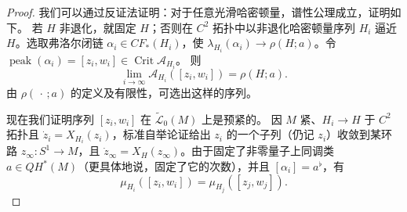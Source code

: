 \begin{proof}
我们可以通过反证法证明：对于任意光滑哈密顿量，谱性公理成立，证明如下。
若 $H$ 非退化，就固定 $H$；否则在 $C^2$ 拓扑中以非退化哈密顿量序列
$H_i$ 逼近 $H$。选取弗洛尔闭链 $\alpha_i\in CF_*(H_i)$，使
$\lambda_{H_i}(\alpha_i)\to\rho(H;a)$。令
$\operatorname{peak}(\alpha_i)=[z_i,w_i]\in\operatorname{Crit}\mathcal A_{H_i}$。
则
\begin{equation}
 \lim_{i\to\infty}\mathcal A_{H_i}([z_i,w_i])=\rho(H;a).
 \label{eq:21-peak-action-limit}
\end{equation}
由 $\rho(\,\cdot\,;a)$ 的定义及有限性，可选出这样的序列。

现在我们证明序列 $[z_i,w_i]$ 在 $\widetilde{\mathcal L}_0(M)$ 上是预紧的。
因 $M$ 紧、$H_i\to H$ 于 $C^2$ 拓扑且 $\dot z_i=X_{H_i}(z_i)$，标准自举论证给出
$z_i$ 的一个子列（仍记 $z_i$）收敛到某环路 $z_\infty:S^1\to M$，且
$\dot z_\infty=X_H(z_\infty)$。由于固定了非零量子上同调类
$a\in QH^*(M)$（更具体地说，固定了它的次数），并且 $[\alpha_i]=a^\flat$，有
\[
 \mu_{H_i}([z_i,w_i])=\mu_{H_j}([z_j,w_j]).
\]


\end{proof}

